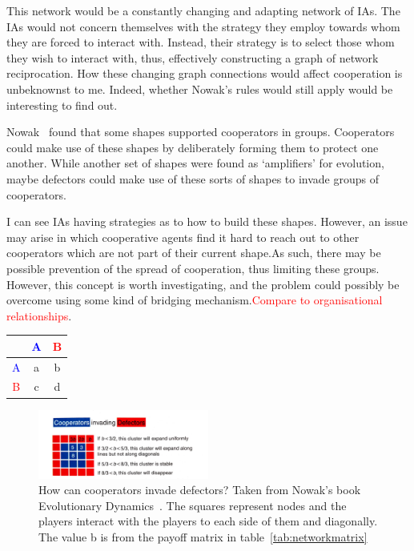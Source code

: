 \documentclass[]{final_report}
\begin{document}
This network would be a constantly changing and adapting network of IAs. The IAs would not concern themselves with the strategy they employ towards whom they are forced to interact with. Instead, their strategy is to select those whom they wish to interact with, thus, effectively constructing a graph of network reciprocation. How these changing graph connections would affect cooperation is unbeknownst to me. Indeed, whether Nowak's rules would still apply would be interesting to find out.\par
Nowak~\cite{nowak2006evolutionary} found that some shapes supported cooperators in groups. Cooperators could make use of these shapes by deliberately forming them to protect one another. While another set of shapes were found as `amplifiers' for evolution, maybe defectors could make use of these sorts of shapes to invade groups of cooperators.\par
I can see IAs having strategies as to how to build these shapes. However, an issue may arise in which cooperative agents find it hard to reach out to other cooperators which are not part of their current shape.As such, there may be possible prevention of the spread of cooperation, thus limiting these groups. However, this concept is worth investigating, and the problem could possibly be overcome using some kind of bridging mechanism.\textcolor{red}{Compare to \cite{jennings2000agent} organisational relationships}.
\begin{framed}
	\begin{center}
		\begin{tabular}{c|cc}
		& \textcolor{blue}{A} & \textcolor{red}{B}\\	
		\hline
		\textcolor{blue}{A} & a & b\\
		\textcolor{red}{B} & c & d\\
		\end{tabular}
		\label{tab:networkmatrix}
	\end{center}	
\end{framed}
\begin{figure}
	\center
	\includegraphics[width=0.5\textwidth]{cooperators-invading-defectors.jpg}
	\caption{How can cooperators invade defectors? Taken from Nowak's book Evolutionary Dynamics~\cite{nowak2006evolutionary}. The squares represent nodes and the players interact with the players to each side of them and diagonally. The value b is from the payoff matrix in table~\ref{tab:networkmatrix}}
	\label{fig:coopinvdef}
\end{figure}
\end{document}
